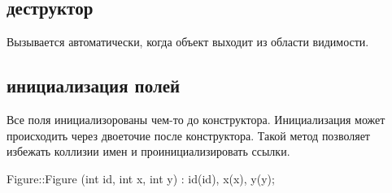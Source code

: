 \subsection{деструктор}
Вызывается автоматически, когда объект выходит из области видимости.
\subsection{инициализация полей}
Все поля инициализорованы чем-то до конструктора. 
Инициализация может происходить через двоеточие после конструктора. Такой метод позволяет избежать коллизии имен и проинициализировать ссылки.
\begin{ccode}
Figure::Figure (int id, int x, int y) : id(id), x(x), y(y);
\end{ccode}
